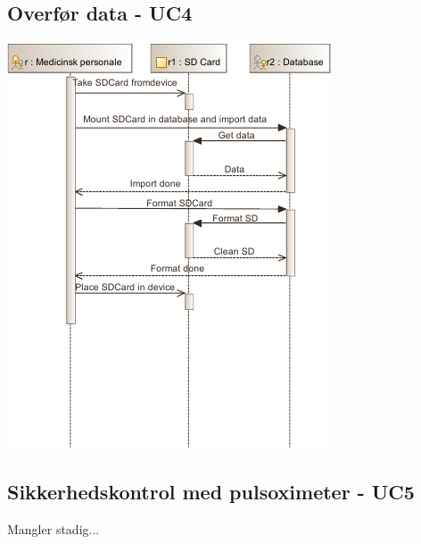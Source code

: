 \subsection{Overfør data - UC4}
\includegraphics[width=\textwidth]{pdfs/SD_UC4-crop.pdf}

\subsection{Sikkerhedskontrol med pulsoximeter - UC5}
Mangler stadig...

